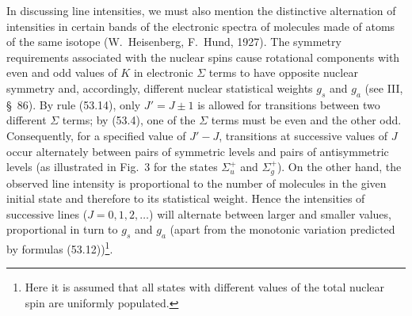 \begin{figure}[ht]
\centering
{}
\caption{}
\end{figure}

In discussing line intensities, we must also mention the distinctive alternation of intensities in certain bands of the electronic spectra of molecules made of atoms of the same isotope (W.~Heisenberg, F.~Hund, 1927). The symmetry requirements associated with the nuclear spins cause rotational components with even and odd values of $K$ in electronic $\Sigma$ terms to have opposite nuclear symmetry and, accordingly, different nuclear statistical weights $g_s$ and $g_a$ (see III, \S~86). By rule (53.14), only $J'=J\pm1$ is allowed for transitions between two different $\Sigma$ terms; by (53.4), one of the $\Sigma$ terms must be even and the other odd. Consequently, for a specified value of $J'-J$, transitions at successive values of $J$ occur alternately between pairs of symmetric levels and pairs of antisymmetric levels (as illustrated in Fig.~3 for the states $\Sigma_u^+$ and $\Sigma_g^+$). On the other hand, the observed line intensity is proportional to the number of molecules in the given initial state and therefore to its statistical weight. Hence the intensities of successive lines ($J=0,1,2,\ldots$) will alternate between larger and smaller values, proportional in turn to $g_s$ and $g_a$ (apart from the monotonic variation predicted by formulas (53.12))\footnote{Here it is assumed that all states with different values of the total nuclear spin are uniformly populated.}.

